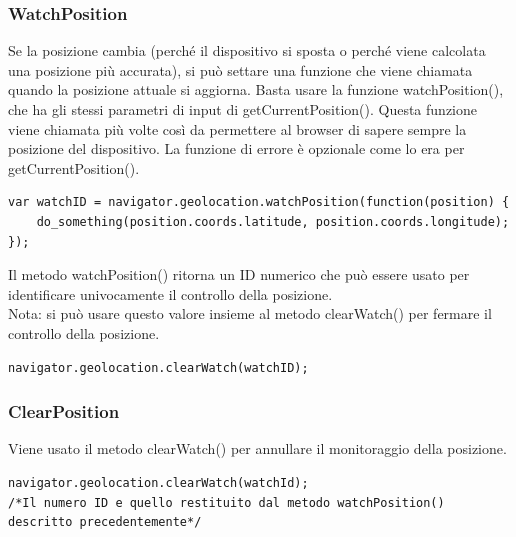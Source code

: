 \documentclass[11pt ,a4paper , twoside , openright ]{article}
\begin{document}
\subsubsection{WatchPosition}
Se la posizione cambia (perché il dispositivo si sposta o perché viene calcolata una posizione più accurata), si può settare una funzione che viene chiamata quando la posizione attuale si aggiorna. Basta usare la funzione watchPosition(), che ha gli stessi parametri di input di getCurrentPosition(). Questa funzione viene chiamata più volte così da permettere al browser di sapere sempre la posizione del dispositivo. La funzione di errore è opzionale come lo era per getCurrentPosition().

\begin{lstlisting}
var watchID = navigator.geolocation.watchPosition(function(position) {
	do_something(position.coords.latitude, position.coords.longitude);
});
\end{lstlisting}
Il metodo watchPosition() ritorna un ID numerico che può essere usato per identificare univocamente il controllo della posizione. 
\\
Nota: si può usare questo valore insieme al metodo clearWatch() per fermare il controllo della posizione.
\begin{lstlisting}
navigator.geolocation.clearWatch(watchID);
\end{lstlisting}

\subsubsection{ClearPosition}
Viene usato il metodo clearWatch() per annullare il monitoraggio della posizione.
\begin{lstlisting}
navigator.geolocation.clearWatch(watchId);
/*Il numero ID e quello restituito dal metodo watchPosition() descritto precedentemente*/
\end{lstlisting}
\newpage
\end{document}
